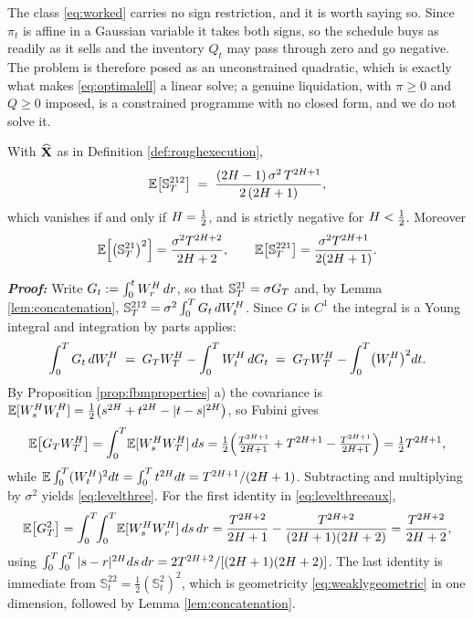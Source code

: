 The class \eqref{eq:worked} carries no sign restriction, and it is worth saying so. Since $\pi_t$ is
affine in a Gaussian variable it takes both signs, so the schedule buys as readily as it sells and
the inventory $Q_t$ may pass through zero and go negative. The problem is therefore posed as an
unconstrained quadratic, which is exactly what makes \eqref{eq:optimalell} a linear solve; a genuine
liquidation, with $\pi\ge0$ and $Q\ge0$ imposed, is a constrained programme with no closed form, and
we do not solve it.

\begin{proposition}\label{prop:levelthree}
With $\widehat{\mathbf{X}}$ as in Definition \ref{def:roughexecution},
\begin{equation}\label{eq:levelthree}
  \mathbb{E}\bigl[\mathbb{S}^{212}_T\bigr]\;=\;\frac{(2H-1)\,\sigma^{2}\,T^{2H+1}}{2\,(2H+1)} ,
\end{equation}
which vanishes if and only if $H=\tfrac12$, and is strictly negative for $H<\tfrac12$.
Moreover
\begin{equation}\label{eq:levelthreeaux}
  \mathbb{E}\Bigl[\bigl(\mathbb{S}^{21}_T\bigr)^{2}\Bigr]=\frac{\sigma^{2}T^{2H+2}}{2H+2},
  \qquad
  \mathbb{E}\bigl[\mathbb{S}^{221}_T\bigr]=\frac{\sigma^{2}T^{2H+1}}{2(2H+1)} .
\end{equation}
\end{proposition}

\textbf{\textit{Proof:}} Write $G_t:=\int_0^tW^{H}_r\,d r$, so that $\mathbb{S}^{21}_T=\sigma G_T$
and, by Lemma \ref{lem:concatenation}, $\mathbb{S}^{212}_T=\sigma^{2}\int_0^{T}G_t\,dW^{H}_t$. Since
$G$ is $C^{1}$ the integral is a Young integral and integration by parts applies:
\[
  \int_0^{T}G_t\,dW^{H}_t \;=\; G_TW^{H}_T-\int_0^{T}W^{H}_t\,d G_t
  \;=\; G_TW^{H}_T-\int_0^{T}\bigl(W^{H}_t\bigr)^{2}d t .
\]
By Proposition \ref{prop:fbmproperties} a) the covariance is
$\mathbb{E}[W^{H}_sW^{H}_t]=\tfrac12\bigl(s^{2H}+t^{2H}-|t-s|^{2H}\bigr)$, so Fubini gives
\[
  \mathbb{E}\bigl[G_TW^{H}_T\bigr]=\int_0^{T}\!\mathbb{E}[W^{H}_sW^{H}_T]\,d s
  =\tfrac12\Bigl(\tfrac{T^{2H+1}}{2H+1}+T^{2H+1}-\tfrac{T^{2H+1}}{2H+1}\Bigr)
  =\tfrac12T^{2H+1},
\]
while $\mathbb{E}\int_0^{T}(W^{H}_t)^{2}d t=\int_0^{T}t^{2H}d t=T^{2H+1}/(2H+1)$.
Subtracting and multiplying by $\sigma^{2}$ yields \eqref{eq:levelthree}. For the first identity in
\eqref{eq:levelthreeaux},
\[
  \mathbb{E}\bigl[G_T^{2}\bigr]=\int_0^{T}\!\!\int_0^{T}\!\mathbb{E}[W^{H}_sW^{H}_r]\,d s\,d r
  =\frac{T^{2H+2}}{2H+1}-\frac{T^{2H+2}}{(2H+1)(2H+2)}
  =\frac{T^{2H+2}}{2H+2},
\]
using $\int_0^{T}\!\int_0^{T}|s-r|^{2H}d s\,d r=2T^{2H+2}/[(2H+1)(2H+2)]$.
The last identity is immediate from $\mathbb{S}^{22}_t=\tfrac12(\mathbb{S}^{2}_t)^{2}$, which is geometricity
\eqref{eq:weaklygeometric} in one dimension, followed by Lemma \ref{lem:concatenation}.
\qedfilledtext

